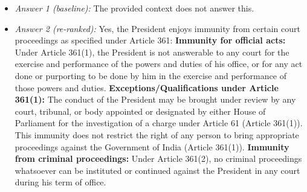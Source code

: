 \documentclass[10pt,a4paper]{article}
\begin{document}
\begin{itemize}[nosep,leftmargin=1.2em]
\item \emph{Answer 1 (baseline):} The provided context does not answer this.
\item \emph{Answer 2 (re-ranked):} Yes, the President enjoys immunity from certain court proceedings as specified under Article 361: \textbullet{} \textbf{Immunity for official acts:} Under Article 361(1), the President is not answerable to any court for the exercise and performance of the powers and duties of his office, or for any act done or purporting to be done by him in the exercise and performance of those powers and duties. \textbullet{} \textbf{Exceptions/Qualifications under Article 361(1):} \textbullet{} The conduct of the President may be brought under review by any court, tribunal, or body appointed or designated by either House of Parliament for the investigation of a charge under Article 61 (Article 361(1)). \textbullet{} This immunity does not restrict the right of any person to bring appropriate proceedings against the Government of India (Article 361(1)). \textbullet{} \textbf{Immunity from criminal proceedings:} Under Article 361(2), no criminal proceedings whatsoever can be instituted or continued against the President in any court during his term of office.
\end{itemize}
\end{document}
